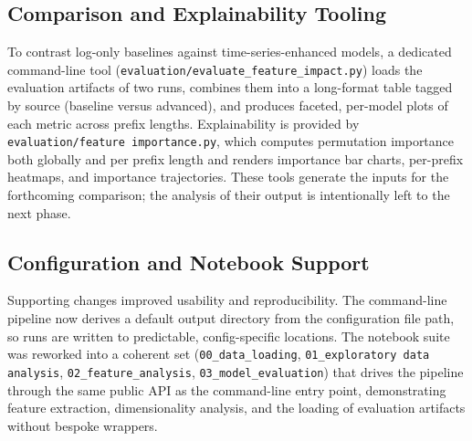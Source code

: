 \documentclass[runningheads]{llncs}
\begin{document}
\subsection{Comparison and Explainability Tooling}
To contrast log-only baselines against time-series-enhanced models, a dedicated command-line
tool (\texttt{evaluation/evaluate\_feature\_impact.py}) loads the evaluation artifacts of two
runs, combines them into a long-format table tagged by source (baseline versus advanced), and
produces faceted, per-model plots of each metric across prefix lengths. Explainability is
provided by \texttt{evaluation/feature importance.py}, which computes permutation importance
both globally and per prefix length and renders importance bar charts, per-prefix heatmaps, and
importance trajectories. These tools generate the inputs for the forthcoming comparison; the
analysis of their output is intentionally left to the next phase.

\subsection{Configuration and Notebook Support}
Supporting changes improved usability and reproducibility. The command-line pipeline now derives
a default output directory from the configuration file path, so runs are written to predictable,
config-specific locations. The notebook suite was reworked into a coherent set
(\texttt{00\_data\_loading}, \texttt{01\_exploratory data analysis},
\texttt{02\_feature\_analysis}, \texttt{03\_model\_evaluation}) that drives the pipeline through
the same public API as the command-line entry point, demonstrating feature extraction,
dimensionality analysis, and the loading of evaluation artifacts without bespoke wrappers.
\end{document}
